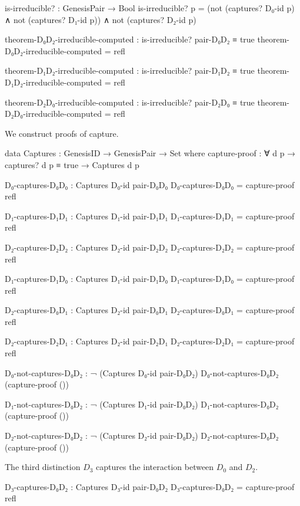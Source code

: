 \documentclass[11pt,a4paper]{book}
\begin{document}
\begin{code}
is-irreducible? : GenesisPair → Bool
is-irreducible? p = (not (captures? D₀-id p) ∧ not (captures? D₁-id p)) ∧ not (captures? D₂-id p)

theorem-D₀D₂-irreducible-computed : is-irreducible? pair-D₀D₂ ≡ true
theorem-D₀D₂-irreducible-computed = refl

theorem-D₁D₂-irreducible-computed : is-irreducible? pair-D₁D₂ ≡ true
theorem-D₁D₂-irreducible-computed = refl

theorem-D₂D₀-irreducible-computed : is-irreducible? pair-D₂D₀ ≡ true
theorem-D₂D₀-irreducible-computed = refl
\end{code}

We construct proofs of capture.

\begin{code}
data Captures : GenesisID → GenesisPair → Set where
  capture-proof : ∀ {d p} → captures? d p ≡ true → Captures d p

D₀-captures-D₀D₀ : Captures D₀-id pair-D₀D₀
D₀-captures-D₀D₀ = capture-proof refl

D₁-captures-D₁D₁ : Captures D₁-id pair-D₁D₁
D₁-captures-D₁D₁ = capture-proof refl

D₂-captures-D₂D₂ : Captures D₂-id pair-D₂D₂
D₂-captures-D₂D₂ = capture-proof refl

D₁-captures-D₁D₀ : Captures D₁-id pair-D₁D₀
D₁-captures-D₁D₀ = capture-proof refl

D₂-captures-D₀D₁ : Captures D₂-id pair-D₀D₁
D₂-captures-D₀D₁ = capture-proof refl

D₂-captures-D₂D₁ : Captures D₂-id pair-D₂D₁
D₂-captures-D₂D₁ = capture-proof refl

D₀-not-captures-D₀D₂ : ¬ (Captures D₀-id pair-D₀D₂)
D₀-not-captures-D₀D₂ (capture-proof ())

D₁-not-captures-D₀D₂ : ¬ (Captures D₁-id pair-D₀D₂)
D₁-not-captures-D₀D₂ (capture-proof ())

D₂-not-captures-D₀D₂ : ¬ (Captures D₂-id pair-D₀D₂)
D₂-not-captures-D₀D₂ (capture-proof ())

\end{code}

The third distinction $D_3$ captures the interaction between $D_0$ and $D_2$.

\begin{code}
D₃-captures-D₀D₂ : Captures D₃-id pair-D₀D₂
D₃-captures-D₀D₂ = capture-proof refl

\end{code}
\end{document}
